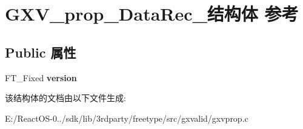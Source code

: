 \hypertarget{struct_g_x_v__prop___data_rec__}{}\section{G\+X\+V\+\_\+prop\+\_\+\+Data\+Rec\+\_\+结构体 参考}
\label{struct_g_x_v__prop___data_rec__}
\subsection*{Public 属性}
\begin{DoxyCompactItemize}
\item 
\mbox{\label{struct_g_x_v__prop___data_rec___a76c638110db91eec8c18f2be862d17d7}} 
F\+T\+\_\+\+Fixed {\bfseries version}
\end{DoxyCompactItemize}


该结构体的文档由以下文件生成\+:\begin{DoxyCompactItemize}
\item 
E\+:/\+React\+O\+S-\/0../sdk/lib/3rdparty/freetype/src/gxvalid/gxvprop.\+c\end{DoxyCompactItemize}
